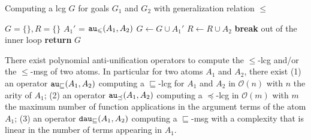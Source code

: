\begin{algorithm}[hbtp]
	\caption{Computing a lcg $G$ for goals $G_1$ and $G_2$ with generalization relation $\leqslant$} 
	\label{algo-rel-1-lcg}
	\begin{algorithmic}
		\State $G = \{\}, R = \{\}$ 
		\State $A_1'$ = $\texttt{au}_\leqslant(A_1, A_2)$
		\State $G \gets G\cup A_1'$
		\State $R \gets R\cup A_2$
		\State \textbf{break} out of the inner loop
		\EndIf
		\EndFor
		\EndFor
		\State \textbf{return} $G$
	\end{algorithmic}
\end{algorithm}

\begin{lemma}\label{lemma-au-op}
	There exist polynomial anti-unification operators to compute the $\leqslant$-lcg and/or the $\leqslant$-msg of two atoms. In particular for two atoms $A_1$ and $A_2$, there exist (1) an operator $\texttt{au}_\sqsubseteq(A_1,A_2)$ computing a $\sqsubseteq$-lcg for ${A_1}$ and ${A_2}$ in $\mathcal{O}(n)$ with $n$ the arity of $A_1$; (2) an operator $\texttt{au}_\preceq(A_1,A_2)$ computing a $\preceq$-lcg in $\mathcal{O}(m)$ with $m$ the maximum number of function applications in the argument terms of the atom $A_1$; (3) an operator $\texttt{dau}_\sqsubseteq(A_1,A_2)$ computing a $\sqsubseteq$-msg with a complexity that is linear in the number of terms appearing in $A_1$.
\end{lemma}
%
